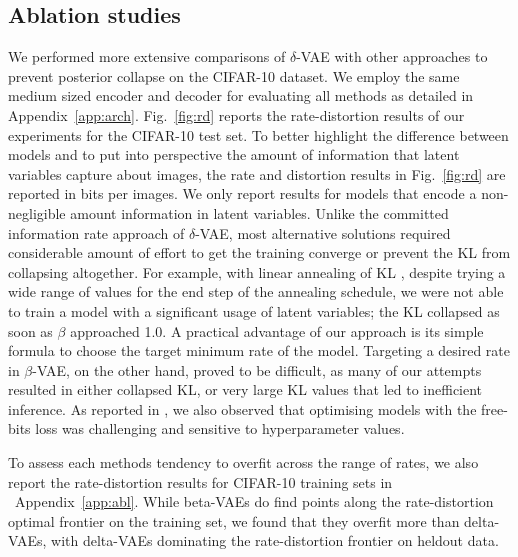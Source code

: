 \documentclass{article} \usepackage{iclr2019_conference,times}
\def\figref#1{figure~\ref{#1}}
\renewcommand{\figref}[1]{Fig.~\ref{#1}}
\newcommand{\aref}[1]{Appendix~\ref{#1}}
\begin{document}
\subsection{Ablation studies}\label{sec:ablation}
We performed more extensive comparisons of $\delta$-VAE with other approaches to prevent posterior collapse on the CIFAR-10 dataset. We employ the same medium sized encoder and decoder for evaluating all methods as detailed in \aref{app:arch}.
\figref{fig:rd} reports the rate-distortion results of our experiments for the CIFAR-10 test set. To better highlight the difference between models and to put into perspective the amount of information that latent variables capture about images, the rate and distortion results in 
\figref{fig:rd} are reported in bits per images. We only report results for models that encode a non-negligible amount information in latent variables. Unlike the committed information rate approach of $\delta$-VAE, most alternative solutions required considerable amount of effort to get the training converge or prevent the KL from collapsing altogether. For example, with linear annealing of KL \citep{Bowman2015}, despite trying a wide range of values for the end step of the annealing schedule, we were not able to train a model with a significant usage of latent variables; the KL collapsed as soon as $\beta$ approached 1.0.
A practical advantage of our approach is its simple formula to choose the target minimum rate of the model. Targeting a desired rate in $\beta$-VAE, on the other hand, proved to be difficult, as many of our attempts resulted in either collapsed KL, or very large KL values that led to inefficient inference. As reported in \cite{VLAE}, we also observed that optimising models with the free-bits loss was challenging and sensitive to hyperparameter values.
\par
To assess each methods tendency to overfit across the range of rates, we also report the rate-distortion results for CIFAR-10 training sets in ~\aref{app:abl}. While beta-VAEs do find points along the rate-distortion optimal frontier on the training set, we found that they overfit more than delta-VAEs, with delta-VAEs dominating the rate-distortion frontier on heldout data.
\end{document}
